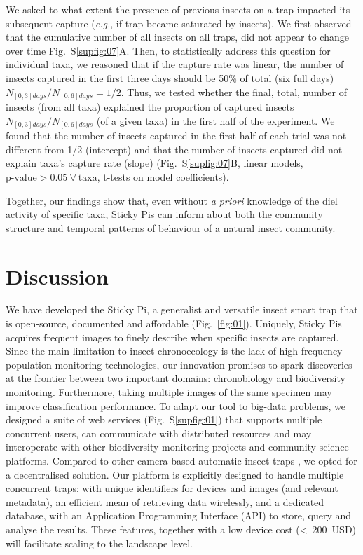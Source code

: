 \documentclass[12pt]{article}
\begin{document}
\begin{linenumbers}
        We asked to what extent the presence of previous insects on a trap impacted its subsequent capture (\emph{e.g.}, if trap became saturated by insects). We first observed that the cumulative number of all insects on all traps, did not appear to change over time Fig.~S\ref{supfig:07}A. Then, to statistically address this question for individual taxa, we reasoned that if the capture rate was linear, the number of insects captured in the first three days should be 50\% of total (six full days) $N_{[0,3]days} / N_{[0, 6]days} = 1/2$. 
		Thus, we tested whether the final, total, number of insects (from all taxa) explained the proportion of captured insects $N_{[0,3]days} / N_{[0,6]days}$ (of a given taxa) in the first half of the experiment. 
		We found that the number of insects captured in the first half of each trial was not different from 1/2 (intercept) and that the number of insects captured did not explain taxa's capture rate (slope) (Fig.~S\ref{supfig:07}B, linear models, $\text{p-value} > 0.05~\forall~\text{taxa}$,  t-tests on model coefficients).


		Together, our findings show that, even without \emph{a priori} knowledge of the diel activity of specific taxa, Sticky Pis can inform about both the community structure and temporal patterns of behaviour of a natural insect community.

		\section*{Discussion}

		
		We have developed the Sticky Pi, a generalist and versatile insect smart trap that is open-source, documented and affordable (Fig.~\ref{fig:01}). Uniquely, Sticky Pis acquires frequent images to finely describe when specific insects are captured. Since the main limitation to insect chronoecology is the lack of high-frequency population monitoring technologies\cite{dominoni_methods_2017}, our innovation promises to spark discoveries at the frontier between two important domains: chronobiology and biodiversity monitoring. Furthermore, taking multiple images of the same specimen may improve classification performance. To adapt our tool to big-data problems, we designed a suite of web services (Fig.~S\ref{supfig:01}) that supports multiple concurrent users, can communicate with distributed resources and may interoperate with other biodiversity monitoring projects and community science platforms\cite{pocock_chapter_2018}.
        Compared to other camera-based automatic insect traps \cite{bjerge_automated_2021}, we opted for a decentralised solution. 
		Our platform is explicitly designed to handle multiple concurrent traps: with unique identifiers for devices and images (and relevant metadata), an efficient mean of retrieving data wirelessly, and a dedicated database, with an Application Programming Interface (API) to store, query and analyse the results. These features, together with a low device cost (<~200~USD) will facilitate scaling to the landscape level.


\end{linenumbers}
\end{document}
